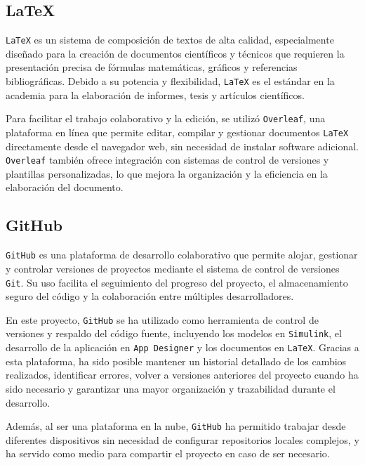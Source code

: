 \subsection{LaTeX}
\texttt{LaTeX} \cite{latexproject} es un sistema de composición de textos de alta calidad, especialmente diseñado para la creación de documentos científicos y técnicos que requieren la presentación precisa de fórmulas matemáticas, gráficos y referencias bibliográficas. Debido a su potencia y flexibilidad, \texttt{LaTeX} es el estándar en la academia para la elaboración de informes, tesis y artículos científicos.

Para facilitar el trabajo colaborativo y la edición, se utilizó \texttt{Overleaf}, una plataforma en línea que permite editar, compilar y gestionar documentos \texttt{LaTeX} directamente desde el navegador web, sin necesidad de instalar software adicional. \texttt{Overleaf} también ofrece integración con sistemas de control de versiones y plantillas personalizadas, lo que mejora la organización y la eficiencia en la elaboración del documento.

\subsection{GitHub}
\texttt{GitHub} \cite{githubdocs} es una plataforma de desarrollo colaborativo que permite alojar, gestionar y controlar versiones de proyectos mediante el sistema de control de versiones \texttt{Git}. Su uso facilita el seguimiento del progreso del proyecto, el almacenamiento seguro del código y la colaboración entre múltiples desarrolladores.

En este proyecto, \texttt{GitHub} se ha utilizado como herramienta de control de versiones y respaldo del código fuente, incluyendo los modelos en \texttt{Simulink}, el desarrollo de la aplicación en \texttt{App Designer} y los documentos en \texttt{LaTeX}. Gracias a esta plataforma, ha sido posible mantener un historial detallado de los cambios realizados, identificar errores, volver a versiones anteriores del proyecto cuando ha sido necesario y garantizar una mayor organización y trazabilidad durante el desarrollo.

Además, al ser una plataforma en la nube, \texttt{GitHub} ha permitido trabajar desde diferentes dispositivos sin necesidad de configurar repositorios locales complejos, y ha servido como medio para compartir el proyecto en caso de ser necesario.

